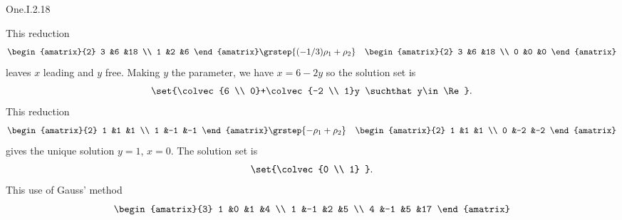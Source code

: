 \begin{ans}{One.I.2.18}
      \begin{exparts}
        \partsitem This reduction
          \begin{eqnarray*}
            \begin{amatrix}{2}
              3  &6  &18 \\
              1  &2  &6
            \end{amatrix}
            &\grstep{(-1/3)\rho_1+\rho_2}
            &\begin{amatrix}{2}
              3  &6  &18 \\
              0  &0  &0
            \end{amatrix}
          \end{eqnarray*}
          leaves \( x \) leading and \( y \) free.
          Making \( y \) the parameter, we have \( x=6-2y \) so the solution
          set is
          \begin{equation*}
            \set{\colvec{6 \\ 0}+\colvec{-2 \\ 1}y
              \suchthat y\in\Re}.
          \end{equation*}
        \partsitem This reduction
          \begin{eqnarray*}
            \begin{amatrix}{2}
              1  &1  &1  \\
              1  &-1 &-1
            \end{amatrix}
            &\grstep{-\rho_1+\rho_2}
            &\begin{amatrix}{2}
              1  &1  &1  \\
              0  &-2 &-2
            \end{amatrix}
          \end{eqnarray*}
          gives the unique solution \( y=1 \), \( x=0 \).
          The solution set is
          \begin{equation*}
            \set{\colvec{0 \\ 1} }.
          \end{equation*}
        \partsitem This use of Gauss' method
          \begin{equation*}
            \begin{amatrix}{3}
              1  &0  &1  &4  \\
              1  &-1 &2  &5  \\
              4  &-1 &5  &17
            \end{amatrix}

\end{equation*}
\end{exparts}
\end{ans}
